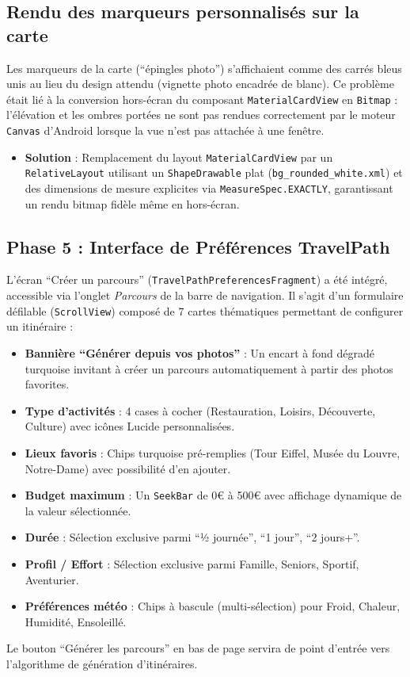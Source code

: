 \documentclass{article}
\begin{document}
\subsection{Rendu des marqueurs personnalisés sur la carte}
Les marqueurs de la carte (``épingles photo'') s'affichaient comme des carrés bleus unis au lieu du design attendu (vignette photo encadrée de blanc). Ce problème était lié à la conversion hors-écran du composant \texttt{MaterialCardView} en \texttt{Bitmap} : l'élévation et les ombres portées ne sont pas rendues correctement par le moteur \texttt{Canvas} d'Android lorsque la vue n'est pas attachée à une fenêtre.
\begin{itemize}
    \item \textbf{Solution} : Remplacement du layout \texttt{MaterialCardView} par un \texttt{RelativeLayout} utilisant un \texttt{ShapeDrawable} plat (\texttt{bg\_rounded\_white.xml}) et des dimensions de mesure explicites via \texttt{MeasureSpec.EXACTLY}, garantissant un rendu bitmap fidèle même en hors-écran.
\end{itemize}

\subsection{Phase 5 : Interface de Préférences TravelPath}
L'écran ``Créer un parcours'' (\texttt{TravelPathPreferencesFragment}) a été intégré, accessible via l'onglet \textit{Parcours} de la barre de navigation. Il s'agit d'un formulaire défilable (\texttt{ScrollView}) composé de 7 cartes thématiques permettant de configurer un itinéraire :
\begin{itemize}
    \item \textbf{Bannière ``Générer depuis vos photos''} : Un encart à fond dégradé turquoise invitant à créer un parcours automatiquement à partir des photos favorites.
    \item \textbf{Type d'activités} : 4 cases à cocher (Restauration, Loisirs, Découverte, Culture) avec icônes Lucide personnalisées.
    \item \textbf{Lieux favoris} : Chips turquoise pré-remplies (Tour Eiffel, Musée du Louvre, Notre-Dame) avec possibilité d'en ajouter.
    \item \textbf{Budget maximum} : Un \texttt{SeekBar} de 0\euro{} à 500\euro{} avec affichage dynamique de la valeur sélectionnée.
    \item \textbf{Durée} : Sélection exclusive parmi ``½ journée'', ``1 jour'', ``2 jours+''.
    \item \textbf{Profil / Effort} : Sélection exclusive parmi Famille, Seniors, Sportif, Aventurier.
    \item \textbf{Préférences météo} : Chips à bascule (multi-sélection) pour Froid, Chaleur, Humidité, Ensoleillé.
\end{itemize}
Le bouton ``Générer les parcours'' en bas de page servira de point d'entrée vers l'algorithme de génération d'itinéraires.
\end{document}

